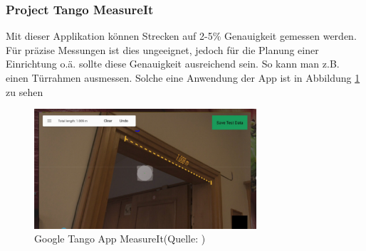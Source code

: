 \subsubsection{Project Tango MeasureIt}
Mit dieser Applikation können Strecken auf 2-5\% Genauigkeit \cite{tango_apps} gemessen werden. Für präzise Messungen ist dies ungeeignet, jedoch für die Planung einer Einrichtung o.ä. sollte diese Genauigkeit ausreichend sein. So kann man z.B. einen Türrahmen ausmessen. Solche eine Anwendung der App ist in Abbildung \ref{measure_it} zu sehen
\begin{figure}[h]
	\centering
	\includegraphics[width=3.25in]{pictures/tango_measure_it}
	\caption{Google Tango App MeasureIt\newline (Quelle: \cite{tango_apps})}
	\label{measure_it}
\end{figure}